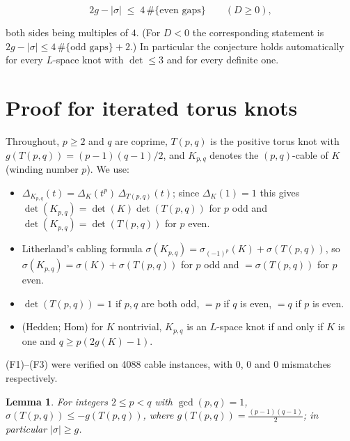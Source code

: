 \documentclass[11pt]{article}
\newtheorem{lemma}{Lemma}
\theoremstyle{definition}
\begin{document}
\[ 2g - |\sigma| \;\le\; 4\,\#\{\text{even gaps}\} \qquad (D \ge 0), \]

both sides being multiples of $4$. (For $D < 0$ the corresponding statement is
$2g - |\sigma| \le 4\,\#\{\text{odd gaps}\} + 2$.) In particular the conjecture holds automatically for every
$L$-space knot with $\det \le 3$ and for every definite one.

\section{Proof for iterated torus knots}

Throughout, $p \ge 2$ and $q$ are coprime, $T(p,q)$ is the positive torus knot with $g(T(p,q)) = (p-1)(q-1)/2$, and
$K_{p,q}$ denotes the $(p,q)$-cable of $K$ (winding number $p$). We use:

\begin{itemize}
\item[(F1)] $\Delta_{K_{p,q}}(t) = \Delta_K(t^p)\,\Delta_{T(p,q)}(t)$; since $\Delta_K(1) = 1$ this gives
  $\det(K_{p,q}) = \det(K)\det(T(p,q))$ for $p$ odd and $\det(K_{p,q}) = \det(T(p,q))$ for $p$ even.
\item[(F2)] Litherland's cabling formula $\sigma(K_{p,q}) = \sigma_{(-1)^p}(K) + \sigma(T(p,q))$, so
  $\sigma(K_{p,q}) = \sigma(K) + \sigma(T(p,q))$ for $p$ odd and $= \sigma(T(p,q))$ for $p$ even.
\item[(F3)] $\det(T(p,q)) = 1$ if $p,q$ are both odd, $= p$ if $q$ is even, $= q$ if $p$ is even.
\item[(F4)] (Hedden; Hom) for $K$ nontrivial, $K_{p,q}$ is an $L$-space knot if and only if $K$ is one and
  $q \ge p(2g(K)-1)$.
\end{itemize}

(F1)--(F3) were verified on 4088 cable instances, with 0, 0 and 0 mismatches respectively.

\begin{lemma}\label{lem:L}
For integers $2 \le p < q$ with $\gcd(p,q) = 1$, \quad
$\sigma(T(p,q)) \le -g(T(p,q))$, where $g(T(p,q)) = \tfrac{(p-1)(q-1)}{2}$; in particular $|\sigma| \ge g$.
\end{lemma}
\end{document}
